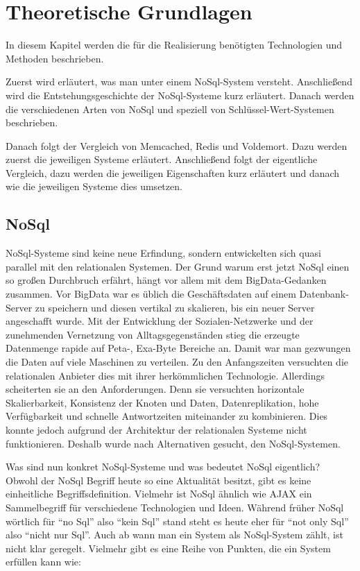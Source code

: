 \chapter{Theoretische Grundlagen}
In diesem Kapitel werden die für die Realisierung benötigten Technologien und
Methoden beschrieben.

Zuerst wird erläutert, was man unter einem NoSql-System versteht. Anschließend
wird die Entstehungsgeschichte der NoSql-Systeme kurz erläutert. Danach werden
die verschiedenen Arten von NoSql und speziell von Schlüssel-Wert-Systemen
beschrieben.

Danach folgt der Vergleich von Memcached, Redis und Voldemort. Dazu werden
zuerst die jeweiligen Systeme erläutert. Anschließend folgt der eigentliche
Vergleich, dazu werden die jeweiligen Eigenschaften kurz erläutert und danach
wie die jeweiligen Systeme dies umsetzen.

\section{NoSql}
NoSql-Systeme sind keine neue Erfindung, sondern entwickelten sich quasi
parallel mit den relationalen Systemen. Der Grund warum erst jetzt NoSql einen
so großen Durchbruch erfährt, hängt vor allem mit dem \gls{BigData}-Gedanken
zusammen. Vor BigData war es üblich die Geschäftsdaten auf einem
Datenbank-Server zu speichern und diesen vertikal zu skalieren, bis ein neuer
Server angeschafft wurde. Mit der Entwicklung der Sozialen-Netzwerke und der
zunehmenden Vernetzung von Alltagsgegenständen stieg die erzeugte Datenmenge
rapide auf Peta-, Exa-Byte Bereiche an. Damit war man gezwungen die Daten auf
viele Maschinen zu verteilen. Zu den Anfangszeiten versuchten die relationalen
Anbieter dies mit ihrer herkömmlichen Technologie. Allerdings scheiterten sie an
den Anforderungen. Denn sie versuchten horizontale Skalierbarkeit, Konsistenz
der Knoten und Daten, Datenreplikation, hohe Verfügbarkeit und schnelle
Antwortzeiten miteinander zu kombinieren. Dies konnte jedoch aufgrund der
Architektur der relationalen Systeme nicht funktionieren. Deshalb wurde nach
Alternativen gesucht, den NoSql-Systemen.

Was sind nun konkret NoSql-Systeme und was bedeutet NoSql eigentlich? Obwohl der
NoSql Begriff heute so eine Aktualität besitzt, gibt es keine einheitliche
Begriffsdefinition. Vielmehr ist NoSql ähnlich wie \gls{AJAX} ein Sammelbegriff
für verschiedene Technologien und Ideen. Während früher NoSql wörtlich
für \enquote{no Sql} also \enquote{kein Sql} stand steht es heute eher für
\enquote{not only Sql} also \enquote{nicht nur Sql}. Auch ab wann man ein System
als NoSql-System zählt, ist nicht klar geregelt. Vielmehr gibt es eine Reihe von
Punkten, die ein System erfüllen kann wie: \cite{Edlich2011}


